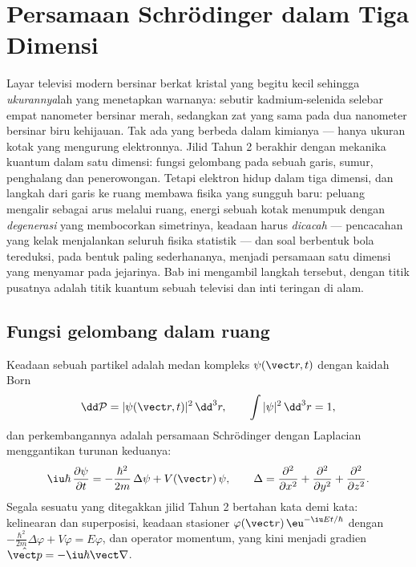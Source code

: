 \chapter{Persamaan Schrödinger dalam Tiga Dimensi}\label{ch:b3:schrodinger-three-dimensions}

Layar televisi modern bersinar berkat kristal yang begitu kecil
sehingga \emph{ukurannya}lah yang menetapkan warnanya: sebutir
kadmium-selenida selebar empat nanometer bersinar merah, sedangkan zat
yang sama pada dua nanometer bersinar biru kehijauan. Tak ada yang
berbeda dalam kimianya --- hanya ukuran kotak yang mengurung
elektronnya. Jilid Tahun 2 berakhir dengan mekanika kuantum dalam satu
dimensi: fungsi gelombang pada sebuah garis, sumur, penghalang dan
penerowongan. Tetapi elektron hidup dalam tiga dimensi, dan langkah dari
garis ke ruang membawa fisika yang sungguh baru: peluang mengalir
sebagai arus melalui ruang, energi sebuah kotak menumpuk dengan
\emph{degenerasi} yang membocorkan simetrinya, keadaan harus
\emph{dicacah} --- pencacahan yang kelak menjalankan seluruh fisika
statistik --- dan soal berbentuk bola tereduksi, pada bentuk paling
sederhananya, menjadi persamaan satu dimensi yang menyamar pada
jejarinya. Bab ini mengambil langkah tersebut, dengan titik pusatnya
adalah titik kuantum sebuah televisi dan inti teringan di alam.

\section{Fungsi gelombang dalam ruang}

\begin{definition}\label{def:b3:schrodinger-three-dimensions:psi3d}
Keadaan sebuah partikel adalah medan kompleks $\psi(\vect r, t)$ dengan
kaidah Born
\[
\dd\mathcal P = |\psi(\vect r, t)|^2\,\dd^3r , \qquad
\int|\psi|^2\,\dd^3r = 1 ,
\]
dan perkembangannya adalah persamaan Schrödinger dengan Laplacian
menggantikan turunan keduanya:
\[
\iu\hbar\,\frac{\partial\psi}{\partial t}
 = -\frac{\hbar^2}{2m}\,\Delta\psi + V(\vect r)\,\psi ,
\qquad
\Delta = \frac{\partial^2}{\partial x^2} +
\frac{\partial^2}{\partial y^2} + \frac{\partial^2}{\partial z^2} .
\]
Segala sesuatu yang ditegakkan jilid Tahun 2 bertahan kata demi kata:
kelinearan dan superposisi, keadaan stasioner
$\varphi(\vect r)\,\eu^{-\iu Et/\hbar}$ dengan
$-\tfrac{\hbar^2}{2m}\Delta\varphi + V\varphi = E\varphi$, dan
operator momentum, yang kini menjadi gradien $\hat{\vect p} =
-\iu\hbar\vect\nabla$.
\end{definition}

